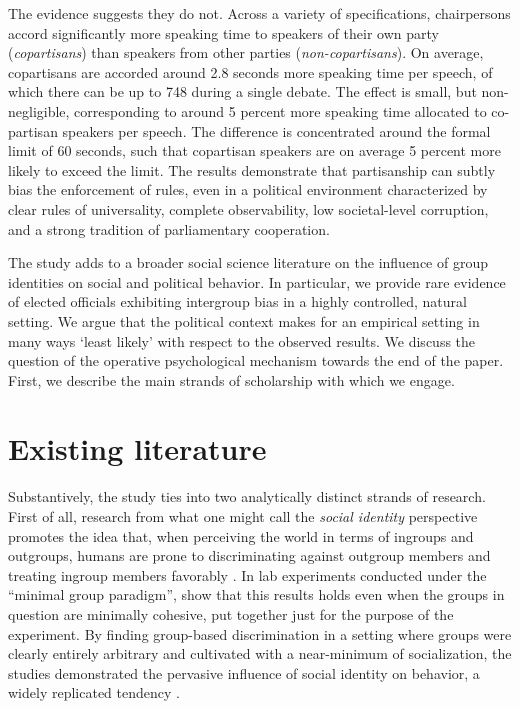 \documentclass[12pt,a4paper]{article}
\begin{document}
The evidence suggests they do not. Across a variety of specifications, chairpersons accord significantly more speaking time to speakers of their own party (\textit{copartisans}) than speakers from other parties (\textit{non-copartisans}). On average, copartisans are accorded around 2.8 seconds  more speaking time per speech, of which there can be up to 748 during a single debate. The effect is small, but non-negligible, corresponding to around 5 percent more speaking time allocated to co-partisan speakers per speech. The difference is concentrated around the formal limit of 60 seconds, such that copartisan speakers are on average 5 percent more likely to exceed the limit. The results demonstrate that partisanship can subtly bias the enforcement of rules, even in a political environment characterized by clear rules of universality, complete observability, low societal-level corruption, and a strong tradition of parliamentary cooperation.

The study adds to a broader social science literature on the influence of group identities on social and political behavior. In particular, we provide rare evidence of elected officials exhibiting intergroup bias in a highly controlled, natural setting. We argue that the political context makes for an empirical setting in many ways `least likely' with respect to the observed results. We discuss the question of the operative psychological mechanism towards the end of the paper. First, we describe the main strands of scholarship with which we engage. 

\section{Existing literature}

Substantively, the study ties into two analytically distinct strands of research. First of all, research from what one might call the \textit{social identity} perspective promotes the idea that, when perceiving the world in terms of ingroups and outgroups, humans are prone to discriminating against outgroup members and treating ingroup members favorably \citep{Hewstone2002}. In lab experiments conducted under the ``minimal group paradigm'', \cite{Tajfel1979,Tajfel1986} show that this results holds even when the groups in question are minimally cohesive, put together just for the purpose of the experiment. By finding group-based discrimination in a setting where groups were clearly entirely arbitrary and cultivated with a near-minimum of socialization, the studies demonstrated the pervasive influence of social identity on behavior, a widely replicated tendency \citep{Brewer1979, Abrams1990, Brown2000, Chen2009}. 
\end{document}
